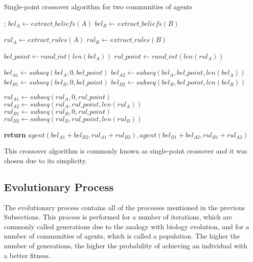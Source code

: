 \begin{algorithm}
\caption{Single-point crossover algorithm for two communities of agents}
    \label{alg:single-point-crossover}
\begin{algorithmic}[1]
    
    ;
    \State $bel_A\gets extract\_beliefs(A)$
    \State $bel_B\gets extract\_beliefs(B)$
    
    \State $rul_A\gets extract\_rules(A)$
    \State $rul_B\gets extract\_rules(B)$
    
    \State $bel\_point\gets rand\_int(len(bel_A))$
    \State $rul\_point\gets rand\_int(len(rul_A))$

    \State $bel_{A1}\gets subseq(bel_A, 0, bel\_point)$
    \State $bel_{A2}\gets subseq(bel_A, bel\_point, len(bel_A))$
    \State $bel_{B1}\gets subseq(bel_B, 0, bel\_point)$
    \State $bel_{B2}\gets subseq(bel_B, bel\_point, len(bel_B))$

    \State $rul_{A1}\gets subseq(rul_A, 0, rul\_point)$
    \State $rul_{A2}\gets subseq(rul_A, rul\_point, len(rul_A))$
    \State $rul_{B1}\gets subseq(rul_B, 0, rul\_point)$
    \State $rul_{B2}\gets subseq(rul_B, rul\_point, len(rul_B))$

    \State \textbf{return} $agent(bel_{A1} + bel_{B2}, rul_{A1} + rul_{B2}),
    agent(bel_{B1} + bel_{A2}, rul_{B1} + rul_{A2})$
    \EndProcedure
\end{algorithmic}
\end{algorithm}

This crossover algorithm is commonly known as single-point crossover and it was
chosen due to its simplicity.


\subsection{Evolutionary Process}
\label{subsection:evolutionary-process}

The evolutionary process contains all of the processes mentioned in the previous
Subsections. This process is performed for a number of iterations, which are
commonly called generations due to the analogy with biology evolution, and for a
number of communities of agents, which is called a population. The higher the
number of generations, the higher the probability of achieving an individual
with a better fitness.

